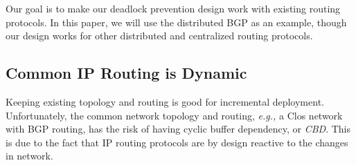 Our goal is to make our deadlock prevention design work with existing routing protocols. In this paper, we will use the distributed BGP as an example, though our design works for other distributed and centralized routing protocols.





\subsection{Common IP Routing is Dynamic}\label{sec:reroute}

Keeping existing topology and routing is good for incremental deployment.
Unfortunately, the common network topology and routing, {\em e.g.,} a Clos network~\cite{fat-tree,vl2} with
BGP routing, has the risk of having cyclic buffer dependency, or {\em CBD}.
This is due to the fact that IP routing protocols are by design reactive to the changes in network.

